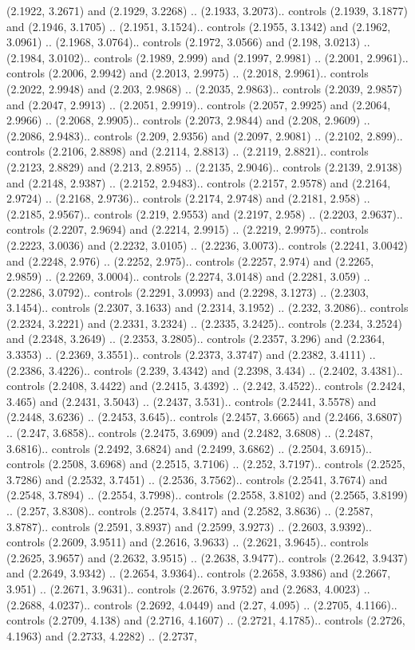 (2.1922, 3.2671) and (2.1929, 3.2268) .. (2.1933, 3.2073).. controls (2.1939, 3.1877) and (2.1946, 3.1705) .. (2.1951, 3.1524).. controls (2.1955, 3.1342) and (2.1962, 3.0961) .. (2.1968, 3.0764).. controls (2.1972, 3.0566) and (2.198, 3.0213) .. (2.1984, 3.0102).. controls (2.1989, 2.999) and (2.1997, 2.9981) .. (2.2001, 2.9961).. controls (2.2006, 2.9942) and (2.2013, 2.9975) .. (2.2018, 2.9961).. controls (2.2022, 2.9948) and (2.203, 2.9868) .. (2.2035, 2.9863).. controls (2.2039, 2.9857) and (2.2047, 2.9913) .. (2.2051, 2.9919).. controls (2.2057, 2.9925) and (2.2064, 2.9966) .. (2.2068, 2.9905).. controls (2.2073, 2.9844) and (2.208, 2.9609) .. (2.2086, 2.9483).. controls (2.209, 2.9356) and (2.2097, 2.9081) .. (2.2102, 2.899).. controls (2.2106, 2.8898) and (2.2114, 2.8813) .. (2.2119, 2.8821).. controls (2.2123, 2.8829) and (2.213, 2.8955) .. (2.2135, 2.9046).. controls (2.2139, 2.9138) and (2.2148, 2.9387) .. (2.2152, 2.9483).. controls (2.2157, 2.9578) and (2.2164, 2.9724) .. (2.2168, 2.9736).. controls (2.2174, 2.9748) and (2.2181, 2.958) .. (2.2185, 2.9567).. controls (2.219, 2.9553) and (2.2197, 2.958) .. (2.2203, 2.9637).. controls (2.2207, 2.9694) and (2.2214, 2.9915) .. (2.2219, 2.9975).. controls (2.2223, 3.0036) and (2.2232, 3.0105) .. (2.2236, 3.0073).. controls (2.2241, 3.0042) and (2.2248, 2.976) .. (2.2252, 2.975).. controls (2.2257, 2.974) and (2.2265, 2.9859) .. (2.2269, 3.0004).. controls (2.2274, 3.0148) and (2.2281, 3.059) .. (2.2286, 3.0792).. controls (2.2291, 3.0993) and (2.2298, 3.1273) .. (2.2303, 3.1454).. controls (2.2307, 3.1633) and (2.2314, 3.1952) .. (2.232, 3.2086).. controls (2.2324, 3.2221) and (2.2331, 3.2324) .. (2.2335, 3.2425).. controls (2.234, 3.2524) and (2.2348, 3.2649) .. (2.2353, 3.2805).. controls (2.2357, 3.296) and (2.2364, 3.3353) .. (2.2369, 3.3551).. controls (2.2373, 3.3747) and (2.2382, 3.4111) .. (2.2386, 3.4226).. controls (2.239, 3.4342) and (2.2398, 3.434) .. (2.2402, 3.4381).. controls (2.2408, 3.4422) and (2.2415, 3.4392) .. (2.242, 3.4522).. controls (2.2424, 3.465) and (2.2431, 3.5043) .. (2.2437, 3.531).. controls (2.2441, 3.5578) and (2.2448, 3.6236) .. (2.2453, 3.645).. controls (2.2457, 3.6665) and (2.2466, 3.6807) .. (2.247, 3.6858).. controls (2.2475, 3.6909) and (2.2482, 3.6808) .. (2.2487, 3.6816).. controls (2.2492, 3.6824) and (2.2499, 3.6862) .. (2.2504, 3.6915).. controls (2.2508, 3.6968) and (2.2515, 3.7106) .. (2.252, 3.7197).. controls (2.2525, 3.7286) and (2.2532, 3.7451) .. (2.2536, 3.7562).. controls (2.2541, 3.7674) and (2.2548, 3.7894) .. (2.2554, 3.7998).. controls (2.2558, 3.8102) and (2.2565, 3.8199) .. (2.257, 3.8308).. controls (2.2574, 3.8417) and (2.2582, 3.8636) .. (2.2587, 3.8787).. controls (2.2591, 3.8937) and (2.2599, 3.9273) .. (2.2603, 3.9392).. controls (2.2609, 3.9511) and (2.2616, 3.9633) .. (2.2621, 3.9645).. controls (2.2625, 3.9657) and (2.2632, 3.9515) .. (2.2638, 3.9477).. controls (2.2642, 3.9437) and (2.2649, 3.9342) .. (2.2654, 3.9364).. controls (2.2658, 3.9386) and (2.2667, 3.951) .. (2.2671, 3.9631).. controls (2.2676, 3.9752) and (2.2683, 4.0023) .. (2.2688, 4.0237).. controls (2.2692, 4.0449) and (2.27, 4.095) .. (2.2705, 4.1166).. controls (2.2709, 4.138) and (2.2716, 4.1607) .. (2.2721, 4.1785).. controls (2.2726, 4.1963) and (2.2733, 4.2282) .. (2.2737, 
